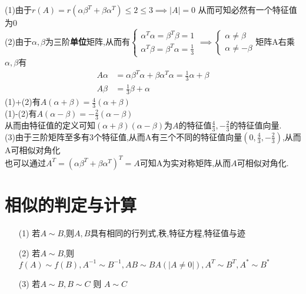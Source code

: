 \documentclass[12pt, a4paper, oneside, UTF8]{ctexbook}
\begin{document}
\begin{enumerate}
    \begin{solution}
    (1)由于$r(A)=r(\alpha\beta^T+\beta\alpha^T)\leq 2 \leq 3 \implies \left|A\right|=0$ 从而可知必然有一个特征值为0 \\
    (2)由于$\alpha,\beta$为三阶\textbf{单位}矩阵,从而有$\begin{cases}
        \alpha^T\alpha=\beta^T\beta=1 \\
        \alpha^T\beta=\beta^T\alpha=\frac{1}{3}
    \end{cases}\implies \begin{cases}
        \alpha \neq \beta \\
        \alpha \neq -\beta
    \end{cases}$矩阵A右乘$\alpha,\beta$有 
    \begin{align*}
        A\alpha &= \alpha\beta^T\alpha+\beta\alpha^T\alpha = \frac{1}{3}\alpha + \beta \tag{1}\\
        A\beta &= \frac{1}{3}\beta+\alpha \tag{2}
    \end{align*}
    (1)+(2)有$A(\alpha+\beta)=\frac{4}{3}(\alpha+\beta)$ \\
    (1)-(2)有$A(\alpha-\beta)=-\frac{2}{3}(\alpha-\beta)$ \\
    从而由特征值的定义可知$(\alpha+\beta)(\alpha-\beta)$为$A$的特征值$\frac{4}{3},-\frac{2}{3}$的特征值向量. \\
    (3)由于三阶矩阵至多有3个特征值,从而A有三个不同的特征值向量$(0,\frac{4}{3},-\frac{2}{3})$,从而A可相似对角化 \\
    也可以通过$A^T=(\alpha\beta^T+\beta\alpha^T)^T=A$可知A为实对称矩阵,从而$A$可相似对角化. 
    \end{solution}
\end{enumerate}

\section{相似的判定与计算}
\begin{definition}[相似的性质]
    \begin{enumerate}
        \item [(1)] 若$A\sim B$,则$A,B$具有相同的行列式,秩,特征方程,特征值与迹
        \item [(2)] 若$A\sim B$,则$f(A)\sim f(B),A^{-1}\sim B^{-1}, AB\sim BA(\left|A\neq 0\right|),A^{T}\sim B^{T},A^{*}\sim B^{*}$ 
        \item [(3)] 若$A\sim B, B\sim C$ 则 $A\sim C$
    \end{enumerate}
\end{definition}
\end{document}
